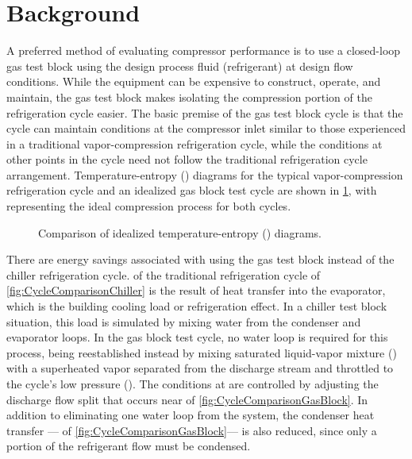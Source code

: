 \section{Background} \label{sec:background}
A preferred method of evaluating compressor performance is to use a closed-loop gas test block
using the design process fluid (refrigerant) at design flow conditions. 
While the equipment can be expensive to construct, operate, and maintain, 
the gas test block makes isolating the compression portion of the refrigeration cycle easier. 
The basic premise of the gas test block cycle is that 
the cycle can maintain conditions at the compressor inlet similar to those experienced in a traditional vapor-compression refrigeration cycle, 
while the conditions at other points in the cycle need not follow the traditional refrigeration cycle arrangement. 
Temperature-entropy (\tssymb)%
%
diagrams for the typical vapor-compression refrigeration cycle 
and an idealized gas block test cycle are shown in \cref{fig:CycleComparison},
with  representing the ideal compression process for both cycles. 
\begin{figure}[htbp]
  \centering
  \hfill
  \caption{Comparison of idealized temperature-entropy (\tssymb) diagrams.}
  \label{fig:CycleComparison}
\end{figure}

There are energy savings associated with using the gas test block 
instead of the chiller refrigeration cycle. 
 of the traditional refrigeration cycle of \cref{fig:CycleComparisonChiller} 
is the result of heat transfer into the evaporator, 
which is the building cooling load or refrigeration effect. 
In a chiller test block situation, this load is simulated 
by mixing water from the condenser and evaporator loops. 
In the gas block test cycle, no water loop is required for this process, 
 being reestablished instead by mixing saturated liquid-vapor mixture () 
with a superheated vapor separated from the discharge stream and throttled to the cycle's low pressure (). 
The conditions at  are controlled by adjusting 
the discharge flow split that occurs near  of \cref{fig:CycleComparisonGasBlock}. 
In addition to eliminating one water loop from the system, the condenser heat transfer%
--- of \cref{fig:CycleComparisonGasBlock}---%
is also reduced, since only a portion of the refrigerant flow must be condensed.

